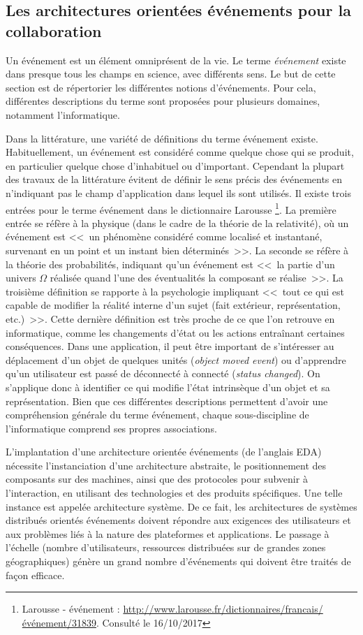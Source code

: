 \subsection{Les architectures orientées événements pour la collaboration}

Un événement est un élément omniprésent de la vie. Le terme \textit{événement} 
existe dans presque tous les champs en science, avec différents sens. Le but de 
cette section est de répertorier les différentes notions d'événements. Pour cela, 
différentes descriptions du terme sont proposées pour plusieurs domaines, notamment
l'informatique. 

Dans la littérature, une variété de définitions du terme événement existe. 
Habituellement, un événement est considéré comme quelque chose qui 
\og se produit\fg{}, en particulier quelque chose d'inhabituel ou d'important. 
Cependant la plupart des travaux de la littérature évitent de définir le sens précis 
des événements en n'indiquant pas le champ d'application dans lequel ils sont 
utilisés. 
Il existe trois entrées pour le terme événement dans le dictionnaire Larousse
\footnote{Larousse - événement : \url{http://www.larousse.fr/dictionnaires/francais/événement/31839}. Consulté le 16/10/2017}. 
La première entrée se réfère à la physique (dans le cadre de la théorie 
de la relativité), où un événement est <<~un phénomène considéré comme 
localisé 
et instantané, survenant en un point et un instant bien déterminés~>>. La seconde 
se réfère à la théorie des probabilités, indiquant qu'un événement est <<~la partie 
d'un univers $\Omega$ réalisée quand l'une des éventualités la composant se 
réalise~>>. La troisième définition se rapporte à la psychologie impliquant <<~tout 
ce qui est capable de modifier la réalité interne d'un sujet (fait extérieur, 
représentation, etc.)~>>. Cette dernière définition est très proche de ce que l'on 
retrouve en informatique, comme les changements d'état ou les actions entraînant 
certaines conséquences. Dans une application, il peut être important de 
s'intéresser au déplacement d'un objet de quelques unités (\textit{object moved 
	event}) ou d'apprendre qu'un utilisateur est passé de déconnecté à connecté 
(\textit{status changed}). On s'applique donc à identifier ce qui modifie l'état 
intrinsèque d'un objet et sa représentation. Bien que ces différentes descriptions 
permettent d'avoir une compréhension générale du terme événement, chaque 
sous-discipline de l'informatique comprend 
ses propres associations.

L'implantation d'une architecture orientée événements (de l'anglais \gls{EDA}) 
nécessite l'instanciation d'une 
architecture abstraite, 
le positionnement des composants sur des machines, ainsi que des protocoles 
pour subvenir à l'interaction, en utilisant des technologies et des produits 
spécifiques. Une telle instance est appelée architecture système. De ce fait, les 
architectures de systèmes distribués orientés événements doivent 
répondre aux exigences des utilisateurs et aux problèmes liés à la nature des 
plateformes et applications. 
Le passage à l'échelle (nombre d'utilisateurs, ressources distribuées sur de 
grandes zones géographiques) génère un grand nombre d'événements qui doivent 
être traités de façon efficace. 

